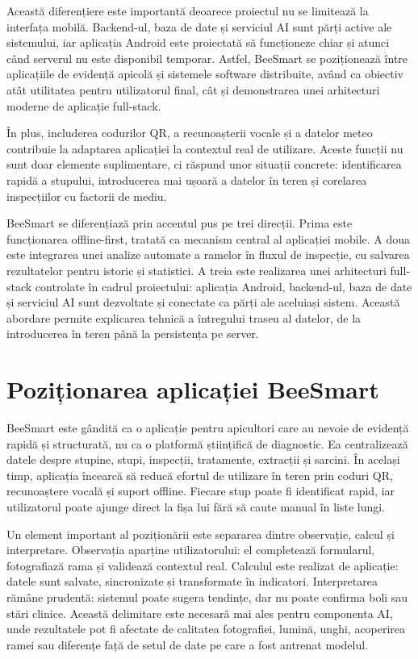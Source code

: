 Această diferențiere este importantă deoarece proiectul nu se limitează la interfața mobilă. Backend-ul, baza de date și serviciul AI sunt părți active ale sistemului, iar aplicația Android este proiectată să funcționeze chiar și atunci când serverul nu este disponibil temporar. Astfel, BeeSmart se poziționează între aplicațiile de evidență apicolă și sistemele software distribuite, având ca obiectiv atât utilitatea pentru utilizatorul final, cât și demonstrarea unei arhitecturi moderne de aplicație full-stack.

În plus, includerea codurilor QR, a recunoașterii vocale și a datelor meteo contribuie la adaptarea aplicației la contextul real de utilizare. Aceste funcții nu sunt doar elemente suplimentare, ci răspund unor situații concrete: identificarea rapidă a stupului, introducerea mai ușoară a datelor în teren și corelarea inspecțiilor cu factorii de mediu.

BeeSmart se diferențiază prin accentul pus pe trei direcții. Prima este funcționarea offline-first, tratată ca mecanism central al aplicației mobile. A doua este integrarea unei analize automate a ramelor în fluxul de inspecție, cu salvarea rezultatelor pentru istoric și statistici. A treia este realizarea unei arhitecturi full-stack controlate în cadrul proiectului: aplicația Android, backend-ul, baza de date și serviciul AI sunt dezvoltate și conectate ca părți ale aceluiași sistem. Această abordare permite explicarea tehnică a întregului traseu al datelor, de la introducerea în teren până la persistența pe server.

\section{Poziționarea aplicației BeeSmart}

BeeSmart este gândită ca o aplicație pentru apicultori care au nevoie de evidență rapidă și structurată, nu ca o platformă științifică de diagnostic. Ea centralizează datele despre stupine, stupi, inspecții, tratamente, extracții și sarcini. În același timp, aplicația încearcă să reducă efortul de utilizare în teren prin coduri QR, recunoaștere vocală și suport offline. Fiecare stup poate fi identificat rapid, iar utilizatorul poate ajunge direct la fișa lui fără să caute manual în liste lungi.

Un element important al poziționării este separarea dintre observație, calcul și interpretare. Observația aparține utilizatorului: el completează formularul, fotografiază rama și validează contextul real. Calculul este realizat de aplicație: datele sunt salvate, sincronizate și transformate în indicatori. Interpretarea rămâne prudentă: sistemul poate sugera tendințe, dar nu poate confirma boli sau stări clinice. Această delimitare este necesară mai ales pentru componenta AI, unde rezultatele pot fi afectate de calitatea fotografiei, lumină, unghi, acoperirea ramei sau diferențe față de setul de date pe care a fost antrenat modelul.


